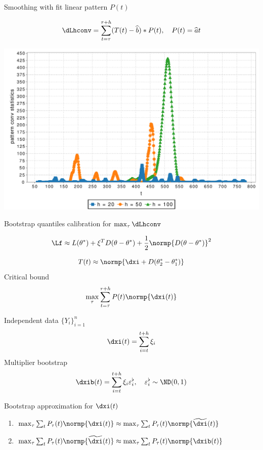 \documentclass[9pt,english]{beamer}   %
\begin{document}
\begin{frame}{Smoothing with fit linear pattern $P(t)$}

\[
\dLhconv = \sum_{t = \tau}^{\tau + h} (T(t) -  \widehat{b}) * P(t),
\quad
P(t) = \widehat{a} t 
\]

\begin{center}
\includegraphics[scale=0.4]{../../img/mlscale_conv.pdf}
\end{center}

\end{frame}

\begin{frame}{Bootstrap quantiles calibration for $\max_{\tau} \dLhconv $}

\[
\Lf \approx L(\theta^*) + \xi^T D(\theta - \theta^*) + \frac{1}{2} \normp{D(\theta - \theta^*)}^2
\]

\[
T(t) \approx \normp{\dxi + D( \theta^*_2 - \theta^*_1 ) }
\]
Critical bound
\[
\max_\tau \sum_{t = \tau}^{\tau + h} P(t)  \normp{\dxi(t)}
\]

 Independent data $\{Y_i \}_{i = 1}^n$
\[
\dxi(t)  = \sum_{i = t}^{t+h} \xi_i
\]
Multiplier bootstrap
\[
\dxib(t)  = \sum_{i = t}^{t+h} \xi_i \varepsilon_i^{\flat},
\quad
\varepsilon_i^{\flat} \sim \ND(0, 1)
\]

\end{frame}

\begin{frame}{Bootstrap approximation for $\dxi(t)$}



\begin{enumerate}
\item $\max_\tau \sum_t P_\tau(t)  \normp{\dxi(t)} \approx \max_\tau \sum_t P_\tau(t)  \normp{\widetilde{\dxi}(t)}$ 
\item $\max_\tau \sum_t P_\tau(t)  \normp{\widetilde{\dxi}(t)} \approx \max_\tau \sum_t P_\tau(t)  \normp{{\dxib}(t)}$ 
\end{enumerate}

\end{frame}
\end{document}
